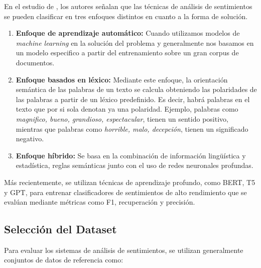 En el estudio de \cite{Bhavitha_sa}, los autores señalan que las técnicas de análisis de sentimientos se pueden clasificar en tres enfoques distintos en cuanto a la forma de solución.
\begin{enumerate}
  \item \textbf{Enfoque de aprendizaje automático:} Cuando utilizamos modelos de \textit{machine learning} en la solución del problema y generalmente nos basamos en un modelo especifico a partir del entrenamiento sobre un gran corpus de documentos.
  \item \textbf{Enfoque basados en léxico:} Mediante este enfoque, la orientación semántica de las palabras de un texto se calcula obteniendo las polaridades de las palabras a partir de un léxico predefinido. Es decir, habrá palabras en el texto que por si sola denotan ya una polaridad. Ejemplo, palabras como \textit{magnifico, bueno, grandioso, espectacular}, tienen un sentido positivo, mientras que palabras como \textit{horrible, malo, decepción}, tienen un significado negativo.
  \item \textbf{Enfoque híbrido:} Se basa en la combinación de información lingüística y estadística, reglas semánticas junto con el uso de redes neuronales profundas.
\end{enumerate}

Más recientemente, se utilizan técnicas de aprendizaje profundo, como BERT, T5 y GPT, para entrenar clasificadores de sentimientos de alto rendimiento que se evalúan mediante métricas como F1, recuperación y precisión. 


\subsection{Selección del Dataset}
\label{subsection-as-dataset-imdb}

Para evaluar los sistemas de análisis de sentimientos, se utilizan generalmente conjuntos de datos de referencia como:

